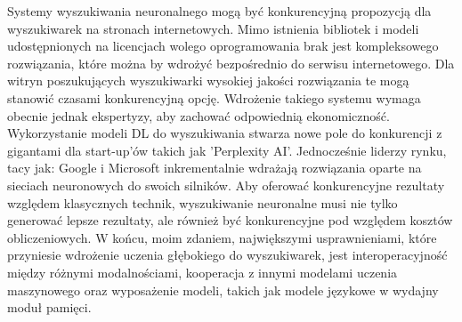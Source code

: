 Systemy wyszukiwania neuronalnego mogą być konkurencyjną propozycją dla wyszukiwarek na stronach internetowych. Mimo istnienia bibliotek i modeli udostępnionych na licencjach wolego oprogramowania brak jest kompleksowego rozwiązania, które można by wdrożyć bezpośrednio do serwisu internetowego. Dla witryn poszukujących wyszukiwarki wysokiej jakości rozwiązania te mogą stanowić czasami konkurencyjną opcję. Wdrożenie takiego systemu wymaga obecnie jednak ekspertyzy, aby zachować odpowiednią ekonomiczność. Wykorzystanie modeli DL do wyszukiwania stwarza nowe pole do konkurencji z gigantami dla start-up'ów takich jak 'Perplexity AI'. Jednocześnie liderzy rynku, tacy jak: Google i Microsoft inkrementalnie wdrażają rozwiązania oparte na sieciach neuronowych do swoich silników. Aby oferować konkurencyjne rezultaty względem klasycznych technik, wyszukiwanie neuronalne musi nie tylko generować lepsze rezultaty, ale również być konkurencyjne pod względem kosztów obliczeniowych. W końcu, moim zdaniem, największymi usprawnieniami, które przyniesie wdrożenie uczenia głębokiego do wyszukiwarek, jest interoperacyjność między różnymi modalnościami, kooperacja z innymi modelami uczenia maszynowego oraz wyposażenie modeli, takich jak modele językowe w wydajny moduł pamięci.\newline
